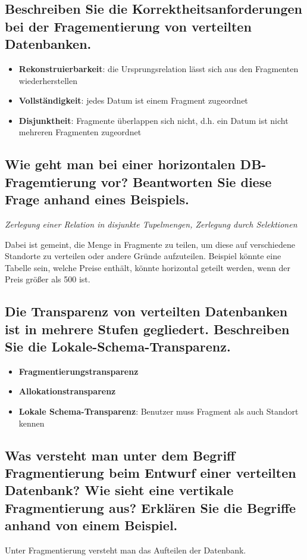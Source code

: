 \subsection{Beschreiben Sie die Korrektheitsanforderungen bei der Fragementierung von verteilten Datenbanken.}
\begin{itemize}
	\item \textbf{Rekonstruierbarkeit}: die Ursprungsrelation lässt sich aus den Fragmenten wiederherstellen
	\item \textbf{Vollständigkeit}: jedes Datum ist einem Fragment zugeordnet
	\item \textbf{Disjunktheit}: Fragmente überlappen sich nicht, d.h. ein Datum ist nicht mehreren Fragmenten zugeordnet
\end{itemize}
\subsection{Wie geht man bei einer horizontalen DB-Fragemtierung vor? Beantworten Sie diese Frage anhand eines Beispiels.}
\textit{Zerlegung einer Relation in disjunkte Tupelmengen, Zerlegung durch Selektionen}

Dabei ist gemeint, die Menge in Fragmente zu teilen, um diese auf verschiedene Standorte zu verteilen oder andere Gründe aufzuteilen. Beispiel könnte eine Tabelle sein, welche Preise enthält, könnte horizontal geteilt werden, wenn der Preis größer als 500 ist.
\subsection{Die Transparenz von verteilten Datenbanken ist in mehrere Stufen gegliedert. Beschreiben Sie die Lokale-Schema-Transparenz.}
\begin{itemize}
	\item \textbf{Fragmentierungstransparenz}
	\item \textbf{Allokationstransparenz}
	\item \textbf{Lokale Schema-Transparenz}: Benutzer muss Fragment als auch Standort kennen
\end{itemize}
\subsection{Was versteht man unter dem Begriff Fragmentierung beim Entwurf einer verteilten Datenbank? Wie sieht eine vertikale Fragmentierung aus? Erklären Sie die Begriffe anhand von einem Beispiel.}
Unter Fragmentierung versteht man das Aufteilen der Datenbank.

